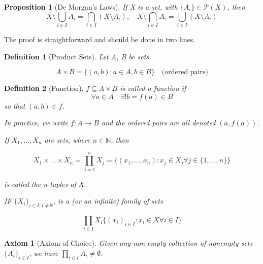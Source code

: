 \documentclass[11pt, oneside]{book}
\theoremstyle{break}
\newtheorem{propo}{Proposition}[section]
\newtheorem{defn}{Definition}[section]
\newtheorem{axiom}{Axiom}[section]
\newcommand{\bb}[1]{\mathbb{#1}}			%
\begin{document}
\begin{propo}[De Morgan's Laws]
	If X is a set, with $\{A_i\} \in \mathcal{P}(X)$, then
	\begin{equation}
		X \setminus \bigcup_{i \in I} A_i = \bigcap_{i \in I} (X \setminus A_i), \quad X \setminus \bigcap_{i \in I} A_i = \bigcup_{i \in I} (X \setminus A_i)
	\end{equation}
\end{propo}

The proof is straightforward and should be done in two lines.

\begin{defn}[Product Sets]
	Let A, B be sets.

	\begin{equation}
		A \times B = \{(a, b): a \in A, b \in B\} \quad \text{(ordered pairs)}
	\end{equation}
\end{defn}

\begin{defn}[Function]
	$f \subseteq A \times B$ is called a function if
	\begin{equation}
		\forall a \in A \quad \exists! b = f(a) \in B
	\end{equation}
	so that $(a, b) \in f$.

	In practice, we write $f: A \to B$ and the ordered pairs are all denoted $(a, f(a))$.

	If $X_1, ..., X_n$ are sets, where $n \in \bb{N}$, then

	\begin{equation}
		X_1 \times \hdots \times X_n = \prod_{j=1}^n X_j = \{(x_1, ..., x_n) : x_j \in X_j \forall j \in \{1, ..., n\}\}
	\end{equation}

	is called the n-tuples of X.

	IF $\{X_i\}_{i \in I, I \neq \emptyset}$, is a (or an infinite) family of sets

	\begin{equation}
		\prod_{i \in I} X_i \{(x_i)_{i \in I} : x_i \in X \forall i \in I\}
	\end{equation}
\end{defn}

\begin{axiom}[Axiom of Choice]
	\label{axiom:ac}
	Given any non empty collection of nonempty sets $\{A_i\}_{i \in I}$, we have $\prod_{i \in I} A_i \neq \emptyset$.
\end{axiom}
\end{document}
